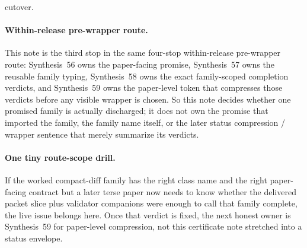 \documentclass[11pt]{article}
\begin{document}
cutover.\cite{series:publicrequestcontracts,series:requestableevidenceclasses,series:publicrequeststatusenvelopes,series:publicrequestcarryforward,series:publicrequestnotices,series:publicrequestnoticenormalforms,series:publicrequestnoticeselections,series:publicrequestresponsemenus,series:publicrequestresponsepackets,series:publicrequestresponsepacketcarryforward,series:publicrequestresponsepacketdeltas,series:publicrequestrefreshnotices,series:publicrequestrefreshnormalforms,series:publicrequestrefreshselections,series:publicrequestsuccessormenus,series:publicrequestsuccessorpackets,series:requestsideterminalcitationnormalform,series:pairedterminalcitationdiscipline,series:pairedterminalcutoverrules,series:workedexample}

\paragraph{Within-release pre-wrapper route.}
This note is the third stop in the same four-stop within-release pre-wrapper route: Synthesis~56 owns the paper-facing promise, Synthesis~57 owns the reusable family typing, Synthesis~58 owns the exact family-scoped completion verdicts, and Synthesis~59 owns the paper-level token that compresses those verdicts before any visible wrapper is chosen. So this note decides whether one promised family is actually discharged; it does not own the promise that imported the family, the family name itself, or the later status compression / wrapper sentence that merely summarize its verdicts.\cite{series:publicrequestcontracts,series:requestableevidenceclasses,series:publicrequeststatusenvelopes}

\paragraph{One tiny route-scope drill.}
If the worked compact-diff family has the right class name and the right paper-facing contract but a later terse paper now needs to know whether the delivered packet slice plus validator companions were enough to call that family complete, the live issue belongs here. Once that verdict is fixed, the next honest owner is Synthesis~59 for paper-level compression, not this certificate note stretched into a status envelope.\cite{series:workedexample}
\end{document}
